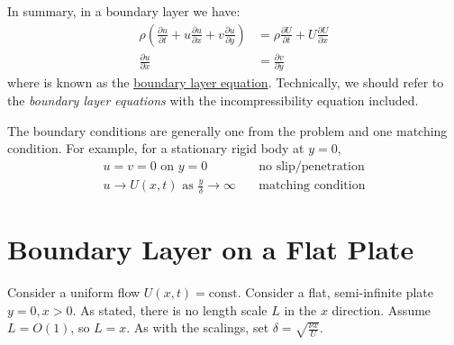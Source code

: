 \documentclass[../Main.tex]{subfiles}
\begin{document}
In summary, in a boundary layer we have:
\begin{align}
    \rho \left(\frac{\partial u}{\partial t} + u \frac{\partial u}{\partial x} + v \frac{\partial u}{\partial y}\right) &= \rho \frac{\partial U}{\partial t} + U \frac{\partial U}{\partial x} \label{eqnBdyLayer} \\
    \frac{\partial u}{\partial x} &= \frac{\partial v}{\partial y} \nonumber
\end{align}
where  is known as the \underline{boundary layer equation}. Technically, we should refer to the \textit{boundary layer equations} with the incompressibility equation included.

The boundary conditions are generally one from the problem and one matching condition. For example, for a stationary rigid body at $y = 0$,
\begin{align*}
    u = v = 0 \text{ on } y = 0& \quad\text{no slip/penetration} \\
    u \to U(x, t) \text{ as } \frac y \delta \to \infty& \quad\text{matching condition}
\end{align*}
\section{Boundary Layer on a Flat Plate}
Consider a uniform flow $U(x, t) = \text{const}$. Consider a flat, semi-infinite plate $y = 0, x > 0$. As stated, there is no length scale $L$ in the $x$ direction. Assume $L = O(1)$, so $L = x$. As with the scalings, set $\delta = \sqrt{\frac{\nu x}{U}}$.
\end{document}
